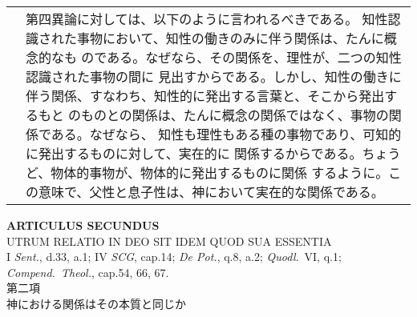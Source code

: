 \documentclass[10pt]{jsarticle} %
\begin{document}
\begin{longtable}{p{21em}p{21em}}
&

第四異論に対しては、以下のように言われるべきである。
知性認識された事物において、知性の働きのみに伴う関係は、たんに概念的なも
 のである。なぜなら、その関係を、理性が、二つの知性認識された事物の間に
 見出すからである。しかし、知性の働きに伴う関係、すなわち、知性的に発出する言葉と、そこから発出するもと
 のものとの関係は、たんに概念の関係ではなく、事物の関係である。なぜなら、
 知性も理性もある種の事物であり、可知的に発出するものに対して、実在的に
 関係するからである。ちょうど、物体的事物が、物体的に発出するものに関係
 するように。この意味で、父性と息子性は、神において実在的な関係である。

\end{longtable}
\newpage





\begin{center}
 {\Large {\bf ARTICULUS SECUNDUS}}\\
 {\large UTRUM RELATIO IN DEO SIT IDEM QUOD SUA ESSENTIA}\\
 {\footnotesize I {\itshape Sent.}, d.33, a.1; IV {\itshape SCG},
 cap.14; {\itshape De Pot.}, q.8, a.2; {\itshape Quodl}.~VI, q.1;
 {\itshape Compend.~Theol.}, cap.54, 66, 67.}\\
 {\Large 第二項\\神における関係はその本質と同じか}
\end{center}
\end{document}
